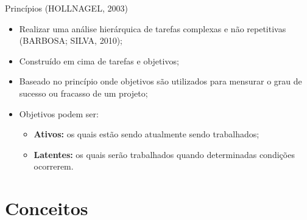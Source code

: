 \documentclass[xcolor=dvipsnames]{beamer}
\let\olditem=\item%
\renewcommand{\item}{\olditem \justifying}%
\begin{document}
\begin{frame}{Princípios (HOLLNAGEL, 2003)}

  \begin{itemize}
  
  	\item Realizar uma análise hierárquica de tarefas complexas e não repetitivas (BARBOSA; SILVA, 2010);
    
    \bigskip
    
	\item Construído em cima de tarefas e objetivos;
    
    \bigskip
    
    \item Baseado no princípio onde objetivos são utilizados para mensurar o grau de sucesso ou fracasso de um projeto;
    
    \bigskip
    
    \item Objetivos podem ser:
    
    	\begin{itemize}
        
        	\item \textbf{Ativos:} os quais estão sendo atualmente sendo trabalhados;
            
            \bigskip
            
            \item \textbf{Latentes:} os quais serão trabalhados quando determinadas condições ocorrerem.
            
    	\end{itemize}
        
  \end{itemize}
  
\end{frame}




\section{Conceitos}
\end{document}
